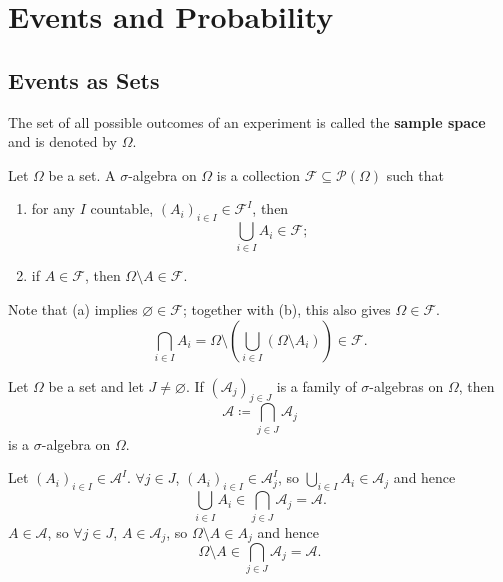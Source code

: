 \chapter{Events and Probability}

\section{Events as Sets}

\begin{definitionbox}
    The set of all possible outcomes of an experiment is called the \textbf{sample space} and is denoted by $\Omega$.
\end{definitionbox}

\begin{definitionbox}
    Let $\Omega$ be a set. A $\sigma$-algebra on $\Omega$ is a collection
    $\mathcal{F}\subseteq \mathscr{P}(\Omega)$ such that
    \begin{enumerate}[label=(\alph*)]
        \item for any $I$ countable, $(A_i)_{i\in I}\in \mathcal{F}^{I}$, then
        $$\bigcup_{i \in I} A_i \in \mathcal{F};$$
        \item if $A \in \mathcal{F}$, then $\Omega\setminus A \in \mathcal{F}$.
    \end{enumerate}
    Note that (a) implies $\varnothing \in \mathcal{F}$; together with (b),
    this also gives $\Omega \in \mathcal{F}$.
    $$\bigcap_{i\in I} A_i= \Omega \setminus \left(\bigcup_{i\in I}\left(\Omega\setminus A_i\right)\right)\in \mathcal{F}.$$
\end{definitionbox}

\begin{propositionbox}
    Let $\Omega$ be a set and let $J\neq\varnothing$. If
    $(\mathcal{A}_{j})_{j\in J}$ is a family of $\sigma$-algebras on
    $\Omega$, then
    $$\mathcal{A}\coloneq \bigcap_{j\in J}\mathcal{A}_j$$
    is a $\sigma$-algebra on $\Omega$.
\end{propositionbox}
\begin{proofbox}
    Let $(A_i)_{i\in I}\in \mathcal{A}^I$. $\forall j\in J$, $(A_i)_{i\in I}\in \mathcal{A}_j^I$, so $\bigcup_{i\in I} A_i\in \mathcal{A}_j$ and hence
    $$ \bigcup_{i\in I} A_i\in \bigcap_{j\in J}\mathcal{A}_j=\mathcal{A}.$$
    $A\in \mathcal{A}$, so $\forall j\in J$, $A\in \mathcal{A}_j$, so $\Omega\setminus A\in A_j$ and hence
    $$ \Omega\setminus A\in \bigcap_{j\in J} \mathcal{A}_j =\mathcal{A}.$$
\end{proofbox}

